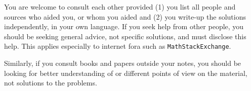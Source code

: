 \documentclass[11pt,reqno]{amsart}
\begin{document}
You are welcome to consult each other provided (1) you list all people and sources who aided you, or whom you aided and (2) you write-up the solutions independently, in your own language. If you seek help from other people, you should be seeking general advice, not specific solutions, and must disclose this help.
This applies especially to internet fora such as \texttt{MathStackExchange}.

Similarly, if you consult books and papers outside your notes, you should be looking for better understanding of or different points of view on the material, not solutions to the problems.
\end{document}
